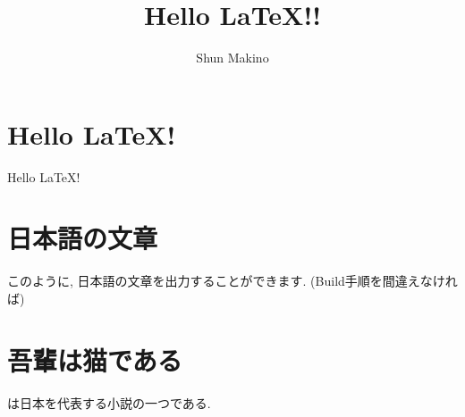 \documentclass{ltjsarticle}
\begin{document}
\title{Hello \LaTeX !!}
\author{Shun Makino}
\date{}

\section{Hello \LaTeX!}
Hello \LaTeX !

\section{日本語の文章}
このように, 日本語の文章を出力することができます. (Build手順を間違えなければ)

\section{吾輩は猫である}
\cite{neko}は日本を代表する小説の一つである. 



\end{document}
